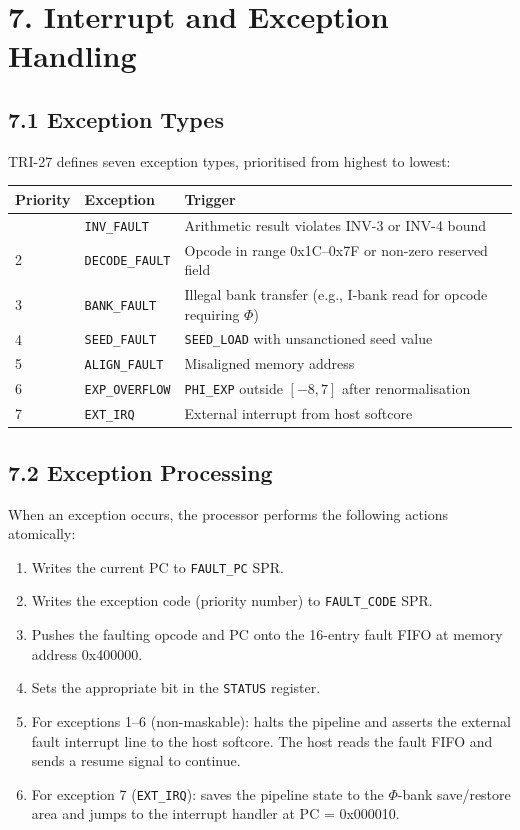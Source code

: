 \section{7. Interrupt and Exception Handling}\label{fa_71:interrupts}

\subsection{7.1 Exception Types}\label{fa_71:exception-types}

TRI-27 defines seven exception types, prioritised from highest to
lowest:

\begin{longtable}[]{@{}llp{6cm}@{}}
\toprule\noalign{}
Priority & Exception & Trigger \\
\midrule\noalign{}
\endhead
\bottomrule\noalign{}
\endlastfoot
1 & \texttt{INV\_FAULT} & Arithmetic result violates INV-3 or INV-4 bound \\
2 & \texttt{DECODE\_FAULT} & Opcode in range 0x1C--0x7F or non-zero reserved field \\
3 & \texttt{BANK\_FAULT} & Illegal bank transfer (e.g., I-bank read for opcode requiring $\Phi$) \\
4 & \texttt{SEED\_FAULT} & \texttt{SEED\_LOAD} with unsanctioned seed value \\
5 & \texttt{ALIGN\_FAULT} & Misaligned memory address \\
6 & \texttt{EXP\_OVERFLOW} & \texttt{PHI\_EXP} outside $[-8, 7]$ after renormalisation \\
7 & \texttt{EXT\_IRQ} & External interrupt from host softcore \\
\end{longtable}

\subsection{7.2 Exception Processing}\label{fa_71:exception-processing}

When an exception occurs, the processor performs the following
actions atomically:

\begin{enumerate}
\def\labelenumi{\arabic{enumi}.}
\item
  Writes the current PC to \texttt{FAULT\_PC} SPR.
\item
  Writes the exception code (priority number) to
  \texttt{FAULT\_CODE} SPR.
\item
  Pushes the faulting opcode and PC onto the 16-entry fault
  FIFO at memory address 0x400000.
\item
  Sets the appropriate bit in the \texttt{STATUS} register.
\item
  For exceptions 1--6 (non-maskable): halts the pipeline and
  asserts the external fault interrupt line to the host
  softcore. The host reads the fault FIFO and sends a resume
  signal to continue.
\item
  For exception 7 (\texttt{EXT\_IRQ}): saves the pipeline state
  to the $\Phi$-bank save/restore area and jumps to the
  interrupt handler at PC = 0x000010.
\end{enumerate}

